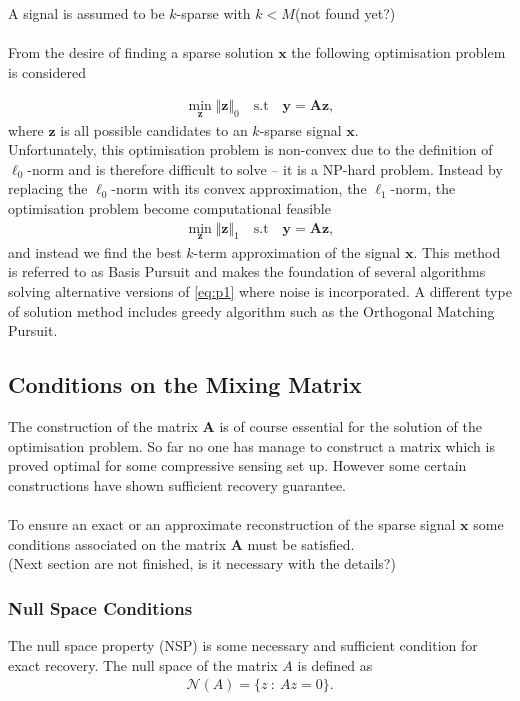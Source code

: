 A signal is assumed to be $k$-sparse with $k<M$\cite[p. 8]{CS}(not found yet?)
\\ \\
From the desire of finding a sparse solution $\mathbf{x}$ the following optimisation problem is considered 

\begin{align*}
\min_{\mathbf{z}} \Vert \mathbf{z} \Vert_0 \quad \text{s.t} \quad \mathbf{y} = \mathbf{Az},
\end{align*}
where $\mathbf{z}$ is all possible candidates to an $k$-sparse signal $\mathbf{x}$.
\\
Unfortunately, this optimisation problem is non-convex due to the definition of $\ell_0$-norm and is therefore difficult to solve -- it is a NP-hard problem. Instead by replacing the $\ell_0$-norm with its convex approximation, the $\ell_1$-norm, the optimisation problem become computational feasible \cite[p. 27]{CS}
\begin{align}\label{eq:p1}
\min_{\mathbf{z}} \Vert \mathbf{z} \Vert_1 \quad \text{s.t} \quad \mathbf{y} = \mathbf{Az},
\end{align} 
and instead we find the best $k$-term approximation of the signal $\mathbf{x}$.
This method is referred to as Basis Pursuit and makes the foundation of several algorithms solving alternative versions of \eqref{eq:p1} where noise is incorporated. A different type of solution method includes greedy algorithm such as the Orthogonal Matching Pursuit.    
      
\subsection{Conditions on the Mixing Matrix}
The construction of the matrix $\mathbf{A}$ is of course essential for the solution of the optimisation problem. So far no one has manage to construct a matrix which is proved optimal for some compressive sensing set up. However some certain constructions have shown sufficient recovery guarantee.\\ 
\\
To ensure an exact or an approximate reconstruction of the sparse signal $\mathbf{x}$ some conditions associated on the matrix $\mathbf{A}$ must be satisfied.\\
(Next section are not finished, is it necessary with the details?)
\subsubsection{Null Space Conditions}
The null space property (NSP) is some necessary and sufficient condition for exact recovery.
The null space of the matrix $A$ is defined as
\begin{align*}
\mathcal{N}(A) = \{ z \ : \ Az = 0 \}.
\end{align*} 





